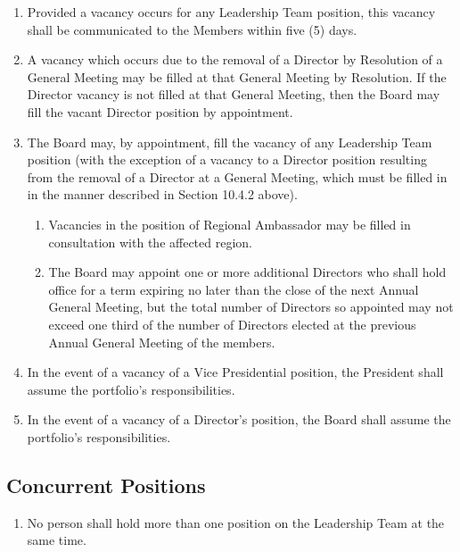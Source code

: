 \begin{enumerate}
 \item Provided a vacancy occurs for any Leadership Team position, this vacancy shall be communicated to the Members within five (5) days.
 \item A vacancy which occurs due to the removal of a Director by Resolution of a General Meeting may be filled at that General Meeting by Resolution. If the Director vacancy is not filled at that General Meeting, then the Board may fill the vacant Director position by appointment.
 \item The Board may, by appointment, fill the vacancy of any Leadership Team position (with the exception of a vacancy to a Director position resulting from the removal of a Director at a General Meeting, which must be filled in in the manner described in Section 10.4.2 above).
  \begin{enumerate}
   \item Vacancies in the position of Regional Ambassador may be filled in consultation with the affected region.
   \item The Board may appoint one or more additional Directors who shall hold office for a term expiring no later than the close of the next Annual General Meeting, but the total number of Directors so appointed may not exceed one third of the number of Directors elected at the previous Annual General Meeting of the members.
  \end{enumerate}
 \item In the event of a vacancy of a Vice Presidential position, the President shall assume the portfolio’s responsibilities.
 \item In the event of a vacancy of a Director’s position, the Board shall assume the portfolio’s responsibilities.
\end{enumerate}

\subsection{Concurrent Positions}
\label{leadership-team-concurrent-positions}

\begin{enumerate}
 \item No person shall hold more than one position on the Leadership Team at the same time.
\end{enumerate}

